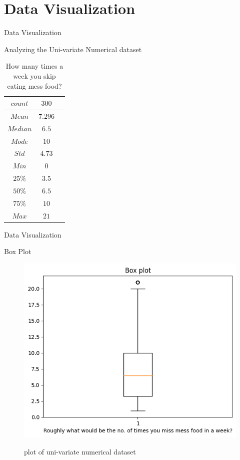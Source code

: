 \documentclass{beamer}
\begin{document}
\section{Data Visualization}
\begin{frame}{Data Visualization}
\begin{block}{Analyzing the Uni-variate Numerical dataset}
    \begin{table}[!h]
    \centering
\caption{How many times a week you skip eating mess food? }
\label{tab:table_label}
    \begin{tabular}{|c|c|c|} 
                 \hline 
        $count$               &$300$     
        
        \\ \hline
        $Mean$   &$7.296$      \\ \hline    
        $Median$    &$6.5$      \\ \hline
        $Mode$       &$10$       \\\hline
        $Std$       &$4.73$ \\\hline
        $Min$       &  $0$ \\\hline
        $25\%$       &$3.5$ \\\hline
        $50\%$       & $6.5$ \\\hline
        $75\%$       &$10$ \\\hline
        $Max$       &$21$ \\ \hline
    \end{tabular}
\end{table}
\end{block}
\end{frame}
\begin{frame}{Data Visualization}
\begin{block}{Box Plot}
\begin{figure}[H]
    \centering
    \caption{plot of uni-variate numerical dataset}
    \includegraphics[scale = 0.55]{box_skipfrequency.png} 
    \label{fig:boxplot}
\end{figure}
\end{block}
\end{frame}
\end{document}
